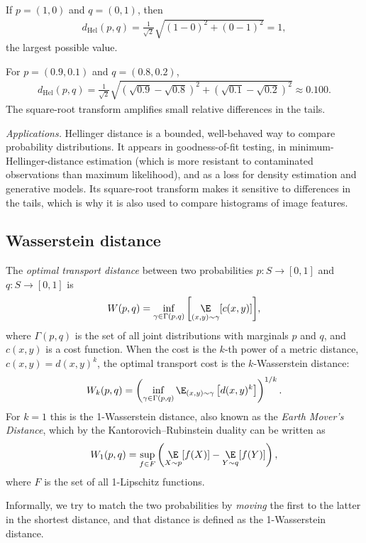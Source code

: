 \documentclass[a4paper, 12pt]{book}
\begin{document}
\begin{example}
    If $p=(1,0)$ and $q=(0,1)$, then
    \begin{align}
        d_{\mathrm{Hel}}(p,q)=\frac{1}{\sqrt2}\sqrt{(1-0)^2+(0-1)^2}=1,
    \end{align}
    the largest possible value.
\end{example}

\begin{example}
    For $p=(0.9,0.1)$ and $q=(0.8,0.2)$,
    \begin{align}
        d_{\mathrm{Hel}}(p,q)=\frac{1}{\sqrt2}\sqrt{(\sqrt{0.9}-\sqrt{0.8})^2
        +(\sqrt{0.1}-\sqrt{0.2})^2}\approx0.100.
    \end{align}
    The square-root transform amplifies small relative differences in the tails.
\end{example}

\emph{Applications.} Hellinger distance is a bounded, well-behaved way to compare probability distributions. It appears in goodness-of-fit testing, in minimum-Hellinger-distance estimation (which is more resistant to contaminated observations than maximum likelihood), and as a loss for density estimation and generative models. Its square-root transform makes it sensitive to differences in the tails, which is why it is also used to compare histograms of image features.

\subsection{Wasserstein distance}

\begin{definition}
    The \emph{optimal transport distance} between two probabilities $p: S \longrightarrow [0,1]$ and $q: S \longrightarrow [0,1]$ is
    \begin{align}
        W(p,q) = \inf_{\gamma \in \Gamma(p,q)} \bigg[ \underset{(x,y) \sim \gamma}{\E}[c(x,y)] \bigg],
    \end{align}
    where $\Gamma(p,q)$ is the set of all joint distributions with marginals $p$ and $q$, and $c(x,y)$ is a cost function. When the cost is the $k$-th power of a metric distance, $c(x,y)=d(x,y)^k$, the optimal transport cost is the $k$-Wasserstein distance:
    \begin{align}
        W_k(p,q) = \left(\inf_{\gamma \in \Gamma(p,q)} \E_{(x,y) \sim \gamma}\left[d(x,y)^k\right]\right)^{1/k}.
    \end{align}
    For $k=1$ this is the 1-Wasserstein distance, also known as the \emph{Earth Mover's Distance}, which by the Kantorovich--Rubinstein duality can be written as
    \begin{align}
        W_1(p,q) = \sup_{f \in F} \left( \underset{X \sim p}{\E}[f(X)] - \underset{Y \sim q}{\E}[f(Y)] \right),
    \end{align}
    where $F$ is the set of all 1-Lipschitz functions.
\end{definition}
Informally, we try to match the two probabilities by \emph{moving} the first to the latter in the shortest distance, and that distance is defined as the 1-Wasserstein distance.
\end{document}
